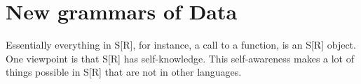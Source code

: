 \documentclass[krantz2]{krantz}\usepackage{knitr}%
\begin{document}

\frontmatter

\maketitle


\setcounter{page}{7} %
\tableofcontents
%

\listoffigures
\listoftables
%
%

\mainmatter


















\chapter{New grammars of Data}\label{chap:R:data}

\begin{VF}
Essentially everything in S[R], for instance, a call to a function, is an S[R] object. One viewpoint is that S[R] has self-knowledge. This self-awareness makes a lot of things possible in S[R] that are not in other languages.

\end{VF}

\end{document}
